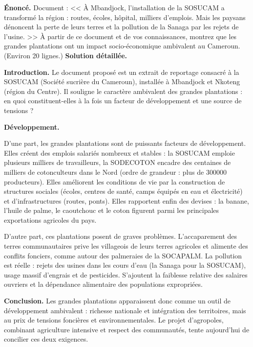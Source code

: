 \documentclass[11pt]{article}
\newcommand{\cle}[1]{{\popxbold\color{popdark}#1}}
\begin{document}
\begin{exoresolu}
\textbf{Énoncé.} Document : << À Mbandjock, l'installation de la SOSUCAM a transformé la région : routes, écoles, hôpital, milliers d'emplois. Mais les paysans dénoncent la perte de leurs terres et la pollution de la Sanaga par les rejets de l'usine. >> À partir de ce document et de vos connaissances, montrez que les grandes plantations ont un impact socio-économique ambivalent au Cameroun. (Environ 20 lignes.)
\tcblower
\textbf{Solution détaillée.}

\textbf{Introduction.} Le document proposé est un extrait de reportage consacré à la SOSUCAM (Société sucrière du Cameroun), installée à Mbandjock et Nkoteng (région du Centre). Il souligne le caractère ambivalent des grandes plantations : en quoi constituent-elles à la fois un facteur de développement et une source de tensions ?

\textbf{Développement.}

D'une part, les grandes plantations sont de puissants \cle{facteurs de développement}. Elles créent des emplois salariés nombreux et stables : la SOSUCAM emploie plusieurs milliers de travailleurs, la SODECOTON encadre des centaines de milliers de cotonculteurs dans le Nord (ordre de grandeur : plus de \num{300000} producteurs). Elles améliorent les conditions de vie par la construction de structures sociales (écoles, centres de santé, camps équipés en eau et électricité) et d'infrastructures (routes, ponts). Elles rapportent enfin des devises : la banane, l'huile de palme, le caoutchouc et le coton figurent parmi les principales exportations agricoles du pays.

D'autre part, ces plantations posent de \cle{graves problèmes}. L'accaparement des terres communautaires prive les villageois de leurs terres agricoles et alimente des conflits fonciers, comme autour des palmeraies de la SOCAPALM. La pollution est réelle : rejets des usines dans les cours d'eau (la Sanaga pour la SOSUCAM), usage massif d'engrais et de pesticides. S'ajoutent la faiblesse relative des salaires ouvriers et la dépendance alimentaire des populations expropriées.

\textbf{Conclusion.} Les grandes plantations apparaissent donc comme un outil de développement ambivalent : richesse nationale et intégration des territoires, mais au prix de tensions foncières et environnementales. Le projet d'\cle{agropoles}, combinant agriculture intensive et respect des communautés, tente aujourd'hui de concilier ces deux exigences.
\end{exoresolu}
\end{document}
